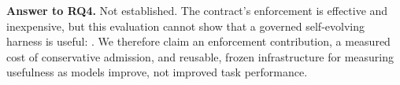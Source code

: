 \textbf{Answer to RQ4.} Not established. The contract's enforcement is effective and inexpensive, but this evaluation cannot show that a governed self-evolving harness is useful: . We therefore claim an enforcement contribution, a measured cost of conservative admission, and reusable, frozen infrastructure for measuring usefulness as models improve, not improved task performance.



